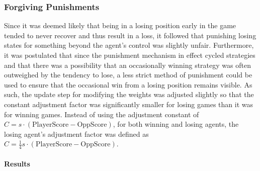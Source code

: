 
\subsubsection*{Forgiving Punishments}
\label{sec:findings-expts-punishments}

Since it was deemed likely that being in a losing position early in the game
tended to never recover and thus result in a loss,
it followed that punishing losing states for something beyond the agent's
control was slightly unfair.
%
Furthermore,
it was postulated that since the punishment mechanism in effect cycled
strategies
and that there was a possibility that an occasionally winning strategy was often
outweighed by the tendency to lose,
a less strict method of punishment could be used to ensure that the occasional
win from a losing position remains visible.
%
As such,
the update step for modifying the weights was adjusted slightly
so that the constant adjustment factor was significantly smaller for losing
games than it was for winning games.
%
Instead of using the adjustment constant of
$C = s \cdot (\text{PlayerScore} - \text{OppScore})$,
for both winning and losing agents,
the losing agent's adjustment factor was defined as
$C = \frac{1}{4} s \cdot (\text{PlayerScore} - \text{OppScore})$.

\paragraph*{Results}

